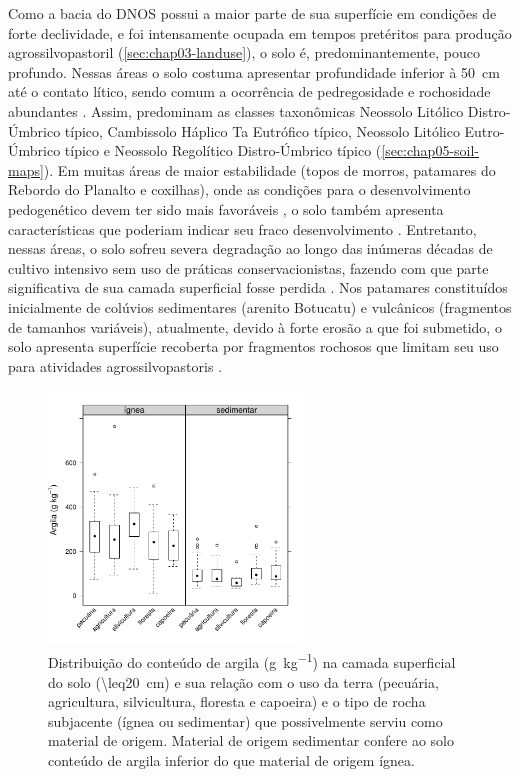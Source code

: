 Como a bacia do DNOS possui a maior parte de sua superfície em condições de forte declividade, e foi 
intensamente ocupada em tempos pretéritos para produção agrossilvopastoril (\autoref{sec:chap03-landuse}), o 
solo é, predominantemente, pouco profundo. Nessas áreas o solo costuma apresentar profundidade inferior à 
\SI{50}{\cm} até o contato lítico, sendo comum a ocorrência de pedregosidade e rochosidade abundantes 
\cite{Miguel2010}. Assim, predominam as classes taxonômicas Neossolo Litólico Distro-Úmbrico típico, 
Cambissolo Háplico Ta Eutrófico típico, Neossolo Litólico Eutro-Úmbrico típico e Neossolo Regolítico 
Distro-Úmbrico típico (\autoref{sec:chap05-soil-maps}). Em muitas áreas de maior estabilidade (topos de 
morros, patamares do Rebordo do Planalto e coxilhas), onde as condições para o desenvolvimento pedogenético 
devem ter sido mais favoráveis \cite{Moser1990}, o solo também apresenta características que poderiam indicar 
seu fraco desenvolvimento \cite{MouraBueno2012}. Entretanto, nessas áreas, o solo sofreu severa degradação ao 
longo das inúmeras décadas de cultivo intensivo sem uso de práticas conservacionistas, fazendo com que parte 
significativa de sua camada superficial fosse perdida \cite{SamuelRosaEtAl2011a}. Nos patamares constituídos 
inicialmente de colúvios sedimentares (arenito Botucatu) e vulcânicos (fragmentos de tamanhos variáveis), 
atualmente, devido à forte erosão a que foi submetido, o solo apresenta superfície recoberta por fragmentos 
rochosos que limitam seu uso para atividades agrossilvopastoris \cite{MouraBueno2012}.

\begin{figure}[!ht]
\centering
\includegraphics[width=0.60\textwidth]{fig/chap03-clay-land-parent}
\caption[Argila no solo e sua relação com o uso da terra e o material de origem do solo.]{Distribuição do 
conteúdo de argila (\si{\gram\per\kilo\gram}) na camada superficial do solo (\SI{\leq20}{\cm}) e sua relação 
com o uso da terra (pecuária, agricultura, silvicultura, floresta e capoeira) e o tipo de rocha subjacente 
(ígnea ou sedimentar) que possivelmente serviu como material de origem. Material de origem sedimentar confere 
ao solo conteúdo de argila inferior do que material de origem ígnea.}
\label{fig:chap03-clay-land-parent}
\end{figure}

